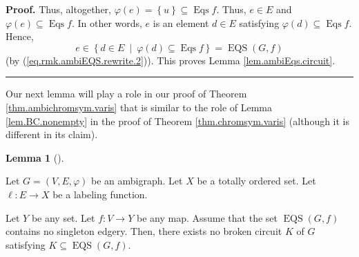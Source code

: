 \documentclass[numbers=enddot,12pt,final,onecolumn,notitlepage]{scrartcl}%
\theoremstyle{definition}
\newtheorem{lem}[theo]{Lemma}
\newenvironment{lemma}[1][]
{\begin{lem}[#1]\begin{leftbar}}
{\end{leftbar}\end{lem}}
\newenvironment{proof}[1][Proof]{\noindent\textbf{#1.} }{\ \rule{0.5em}{0.5em}}
\newenvironment{verlong}{}{}
\begin{document}
\begin{verlong}
\begin{proof}
Thus, altogether, $\varphi\left(  e\right)  =\left\{  u\right\}
\subseteq\operatorname*{Eqs}f$. Thus, $e\in E$ and $\varphi\left(  e\right)
\subseteq\operatorname*{Eqs}f$. In other words, $e$ is an element $d\in E$
satisfying $\varphi\left(  d\right)  \subseteq\operatorname*{Eqs}f$. Hence,%
\[
e\in\left\{  d\in E\ \mid\ \varphi\left(  d\right)  \subseteq
\operatorname*{Eqs}f\right\}  =\operatorname*{EQS}\left(  G,f\right)
\]
(by (\ref{eq.rmk.ambiEQS.rewrite.2})). This proves Lemma
\ref{lem.ambiEqs.circuit}.
\end{proof}
\end{verlong}

Our next lemma will play a role in our proof of Theorem
\ref{thm.ambichromsym.varis} that is similar to the role of Lemma
\ref{lem.BC.nonempty} in the proof of Theorem \ref{thm.chromsym.varis}
(although it is different in its claim).

\begin{lemma}
\label{lem.ambiEqs.no-bc}Let $G=\left(  V,E,\varphi\right)  $ be an ambigraph.
Let $X$ be a totally ordered set. Let $\ell:E\rightarrow X$ be a labeling function.

Let $Y$ be any set. Let $f:V\rightarrow Y$ be any map. Assume that the set
$\operatorname*{EQS}\left(  G,f\right)  $ contains no singleton edgery. Then,
there exists no broken circuit $K$ of $G$ satisfying $K\subseteq
\operatorname*{EQS}\left(  G,f\right)  $.
\end{lemma}
\end{document}
